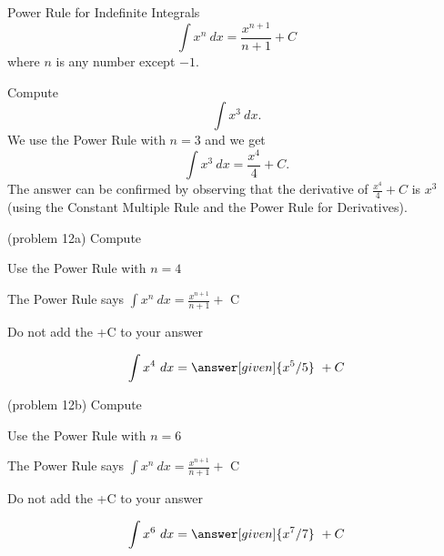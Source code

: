 \documentclass{ximera}
\begin{document}
\begin{theorem} Power Rule for Indefinite Integrals
\[
\int x^n \ dx = \frac{x^{n+1}}{n+1} +C 
\]
where $n$ is any number except $-1$.
\end{theorem}




\begin{example}[example 12]
Compute $$\int x^3 \ dx.$$
We use the Power Rule with $n= 3$ and we get
\[\int x^3 \ dx = \frac{x^4}{4} + C.\]  The answer can be confirmed by observing that the 
derivative of $\frac{x^4}{4} +C$ is $x^3$ (using the Constant Multiple Rule and the Power Rule for Derivatives).
\end{example}

\begin{problem}(problem 12a)
Compute 

\begin{hint}
Use the Power Rule with $n=4$
\end{hint}
\begin{hint}
The Power Rule says $\int x^n \ dx = \frac{x^{n+1}}{n+1} +$ C
\end{hint}
\begin{hint}
\begin{center}
Do not add the +C to your answer
\end{center}
\end{hint}

\[
\int x^4 \ dx =
\answer[given]{x^5 /5} \ + C
\]
\end{problem}


\begin{problem}(problem 12b)
Compute 

\begin{hint}
Use the Power Rule with $n=6$
\end{hint}
\begin{hint}
The Power Rule says $\int x^n \ dx = \frac{x^{n+1}}{n+1} +$ C
\end{hint}
\begin{hint}
\begin{center}
Do not add the +C to your answer
\end{center}
\end{hint}

\[
\int x^6 \ dx =
\answer[given]{x^7 /7} \ + C
\]
\end{problem}
\end{document}
